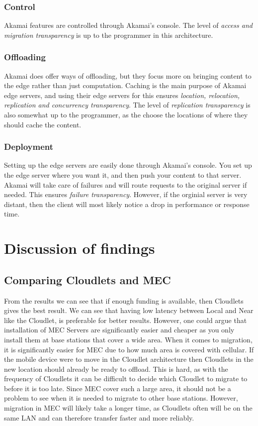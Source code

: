 \subsubsection{Control}
Akamai features are controlled through Akamai's console. The level of \textit{access and migration transparency} is up to the programmer in this architecture.

\subsubsection{Offloading}
Akamai does offer ways of offloading, but they focus more on bringing content to the edge rather than just computation. Caching is the main purpose of Akamai edge servers, and using their edge servers for this ensures \textit{location, relocation, replication and concurrency transparency}. The level of \textit{replication transparency} is also somewhat up to the programmer, as the choose the locations of where they should cache the content.

\subsubsection{Deployment}
Setting up the edge servers are easily done through Akamai's console. You set up the edge server where you want it, and then push your content to that server. Akamai will take care of failures and will route requests to the original server if needed. This ensures \textit{failure transparency}. However, if the orginial server is very distant, then the client will most likely notice a drop in performance or response time.






\section{Discussion of findings}

\subsection{Comparing Cloudlets and MEC}
From the results we can see that if enough funding is available, then Cloudlets gives the best result. We can see that having low latency between Local and Near like the Cloudlet, is preferable for better results. However, one could argue that installation of MEC Servers are significantly easier and cheaper as you only install them at base stations that cover a wide area. When it comes to migration, it is significantly easier for MEC due to how much area is covered with cellular. If the mobile device were to move in the Cloudlet architecture then Cloudlets in the new location should already be ready to offload. This is hard, as with the frequency of Cloudlets it can be difficult to decide which Cloudlet to migrate to before it is too late. Since MEC cover such a large area, it should not be a problem to see when it is needed to migrate to other base stations. However, migration in MEC will likely take a longer time, as Cloudlets often will be on the same LAN and can therefore transfer faster and more reliably.

